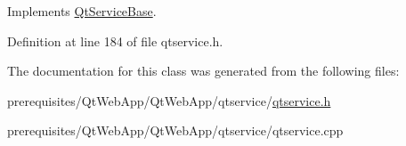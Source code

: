 Implements \mbox{\hyperlink{class_qt_service_base_ab70633cd29a22758dfa0502b77e564f6}{Qt\+Service\+Base}}.



Definition at line 184 of file qtservice.\+h.



The documentation for this class was generated from the following files\+:\begin{DoxyCompactItemize}
\item 
prerequisites/\+Qt\+Web\+App/\+Qt\+Web\+App/qtservice/\mbox{\hyperlink{qtservice_8h}{qtservice.\+h}}\item 
prerequisites/\+Qt\+Web\+App/\+Qt\+Web\+App/qtservice/qtservice.\+cpp\end{DoxyCompactItemize}
